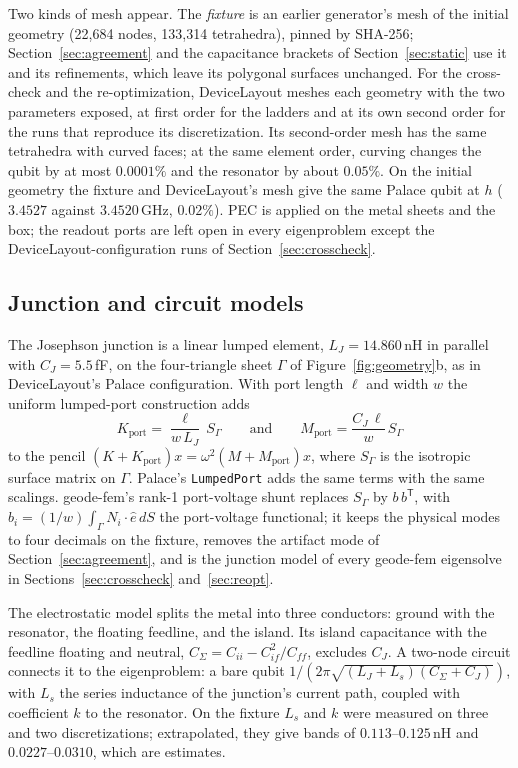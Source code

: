 \documentclass{anvil-paper}
\begin{document}
Two kinds of mesh appear. The \emph{fixture} is an earlier generator's mesh
of the initial geometry (22{,}684 nodes, 133{,}314 tetrahedra), pinned by
SHA-256;
Section~\ref{sec:agreement} and the capacitance brackets of
Section~\ref{sec:static} use it and its refinements, which leave its
polygonal surfaces unchanged. For the cross-check and the re-optimization,
DeviceLayout meshes each geometry with the two parameters exposed, at first
order for the ladders and at its own second order for the runs that
reproduce its discretization. Its second-order mesh has the same
tetrahedra with curved faces; at the same element order, curving changes
the qubit by at most $0.0001\%$ and the resonator by about $0.05\%$. On the
initial geometry the fixture and DeviceLayout's mesh give the same Palace
qubit at $h$ ($3.4527$ against $3.4520$\,GHz, $0.02\%$). PEC is applied on
the metal sheets and the box; the readout ports are left open in every
eigenproblem except the DeviceLayout-configuration runs of
Section~\ref{sec:crosscheck}.

\subsection{Junction and circuit models}
\label{sec:junction}

The Josephson junction is a linear lumped element, $L_J = 14.860$\,nH in
parallel with $C_J = 5.5$\,fF, on the four-triangle sheet $\Gamma$ of
Figure~\ref{fig:geometry}b, as in DeviceLayout's Palace configuration. With
port length $\ell$ and width $w$ the uniform lumped-port construction adds
\begin{equation}
  K_{\mathrm{port}} = \frac{\ell}{w\,L_J}\, S_\Gamma
  \qquad\text{and}\qquad
  M_{\mathrm{port}} = \frac{C_J\,\ell}{w}\, S_\Gamma
  \label{eq:port}
\end{equation}
to the pencil $(K + K_{\mathrm{port}})x = \omega^2(M + M_{\mathrm{port}})x$,
where $S_\Gamma$ is the isotropic surface matrix on $\Gamma$. Palace's
\texttt{LumpedPort} adds the same terms with the same scalings. geode-fem's
rank-1 port-voltage shunt replaces $S_\Gamma$ by $b\,b^{\mathsf T}$, with
$b_i = (1/w)\int_\Gamma N_i\cdot\hat e\,dS$ the port-voltage functional; it
keeps the physical modes to four decimals on the fixture, removes the
artifact mode of Section~\ref{sec:agreement}, and is the junction model of
every geode-fem eigensolve in Sections~\ref{sec:crosscheck}
and~\ref{sec:reopt}.

The electrostatic model splits the metal into three conductors: ground
with the resonator, the floating feedline, and the island. Its island
capacitance with the feedline floating and neutral,
$C_\Sigma = C_{ii} - C_{if}^2/C_{ff}$, excludes $C_J$. A two-node circuit
connects it to the eigenproblem: a bare qubit
$1/(2\pi\sqrt{(L_J + L_s)(C_\Sigma + C_J)})$, with $L_s$ the series
inductance of the junction's current path, coupled with coefficient $k$
to the resonator. On the fixture $L_s$ and $k$ were measured on three and
two discretizations; extrapolated, they give bands of $0.113$--$0.125$\,nH
and $0.0227$--$0.0310$, which are estimates.
\end{document}
